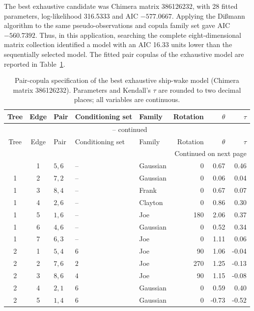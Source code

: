\documentclass[preprint,12pt, a4paper]{elsarticle}
\begin{document}
The best exhaustive candidate was Chimera matrix 386126232, with 28 fitted
parameters, log-likelihood 316.5333 and AIC \(-577.0667\). Applying the
Di{\ss}mann algorithm to the same pseudo-observations and copula family set
gave AIC \(-560.7392\). Thus, in this application, searching the complete
eight-dimensional matrix collection identified a model with an AIC 16.33
units lower than the sequentially selected model. The fitted pair copulas of
the exhaustive model are reported in Table~\ref{tab:ship-wake-bicopulas}.

\begingroup
\footnotesize
\setlength{\tabcolsep}{4pt}
\renewcommand{\arraystretch}{1.05}
\begin{longtable}{@{}cc>{\centering\arraybackslash}p{1.25cm}>{\centering\arraybackslash}p{2.45cm}lrrr@{}}
\caption{Pair-copula specification of the best exhaustive ship-wake model
(Chimera matrix 386126232). Parameters and Kendall's $\tau$ are rounded to two
decimal places; all variables are continuous.}
\label{tab:ship-wake-bicopulas}\\
\toprule
Tree & Edge & Pair & Conditioning set & Family & Rotation & $\theta$ & $\tau$ \\
\midrule
\endfirsthead
\multicolumn{8}{c}{\tablename\ \thetable{} -- continued}\\
\toprule
Tree & Edge & Pair & Conditioning set & Family & Rotation & $\theta$ & $\tau$ \\
\midrule
\endhead
\midrule
\multicolumn{8}{r}{Continued on next page}\\
\endfoot
\bottomrule
\endlastfoot
1 & 1 & $5,6$ & -- & Gaussian & 0 & 0.67 & 0.46 \\
1 & 2 & $7,2$ & -- & Gaussian & 0 & 0.06 & 0.04 \\
1 & 3 & $8,4$ & -- & Frank & 0 & 0.67 & 0.07 \\
1 & 4 & $2,6$ & -- & Clayton & 0 & 0.86 & 0.30 \\
1 & 5 & $1,6$ & -- & Joe & 180 & 2.06 & 0.37 \\
1 & 6 & $4,6$ & -- & Gaussian & 0 & 0.52 & 0.34 \\
1 & 7 & $6,3$ & -- & Joe & 0 & 1.11 & 0.06 \\
2 & 1 & $5,4$ & $6$ & Joe & 90 & 1.06 & -0.04 \\
2 & 2 & $7,6$ & $2$ & Joe & 270 & 1.25 & -0.13 \\
2 & 3 & $8,6$ & $4$ & Joe & 90 & 1.15 & -0.08 \\
2 & 4 & $2,1$ & $6$ & Gaussian & 0 & 0.59 & 0.40 \\
2 & 5 & $1,4$ & $6$ & Gaussian & 0 & -0.73 & -0.52 \\

\end{longtable}
\end{document}
